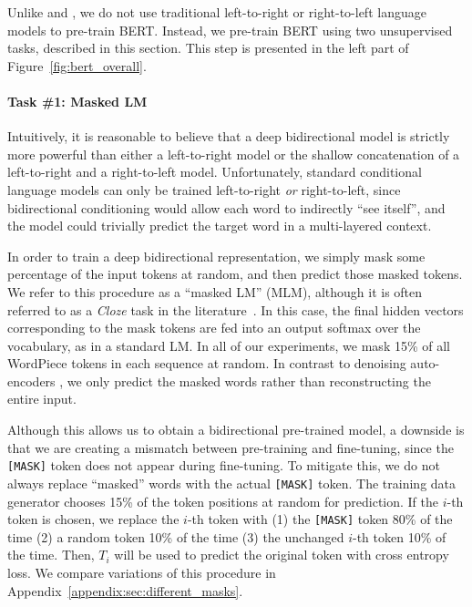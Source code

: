 \documentclass[11pt,a4paper]{article}
\begin{document}
Unlike \citet{peters-etal:2018:_deep} and \citet{radford-etal:2018}, we do not use traditional left-to-right or right-to-left language models to pre-train BERT. Instead, we pre-train BERT using two unsupervised tasks, described in this section. This step
is presented in the left part of Figure~\ref{fig:bert_overall}.

\paragraph{Task \#1: Masked LM}
Intuitively, it is reasonable to believe that a deep bidirectional model is strictly more powerful than either a left-to-right model or the shallow concatenation of a left-to-right and a right-to-left model. Unfortunately, standard conditional language models can only be trained left-to-right {\it or} right-to-left, since bidirectional conditioning would 
allow each word to indirectly ``see itself'', and
the model could trivially predict the target word in a multi-layered context.

In order to train a deep bidirectional representation, we simply mask some percentage of the input tokens at random, and then predict those masked tokens. We refer to this procedure as a ``masked LM'' (MLM), although it is often referred to as a {\it Cloze} task in the literature~\cite{taylor:1953:_cloze}. In this case, the final hidden vectors corresponding to the mask tokens are fed into an output softmax over the vocabulary, as in a standard LM. In all of our experiments, we mask 15\% of all WordPiece tokens in each sequence at random. In contrast to denoising auto-encoders \cite{vincent:2008}, we only predict the masked words rather than reconstructing the entire input.  

Although this allows us to obtain a bidirectional pre-trained model, a downside is that we are creating a mismatch between pre-training and fine-tuning, since the {\tt [MASK]} token does not appear during fine-tuning. To mitigate this, we do not always replace ``masked'' words with the actual {\tt [MASK]} token. The training data generator chooses 15\% of the token positions at random for prediction. If the $i$-th token is chosen, we replace the $i$-th token with (1) the {\tt [MASK]} token 80\% of the time (2) a random token 10\% of the time (3) the unchanged $i$-th token 10\% of the time. Then, $T_i$ will be used to predict the original token with cross entropy loss.
We compare variations of this procedure in Appendix~\ref{appendix:sec:different_masks}.
\vspace{.2cm}
\end{document}
